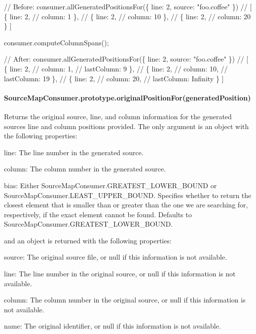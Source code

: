 \begin{DoxyCode}
// Before:
consumer.allGeneratedPositionsFor(\{ line: 2, source: "foo.coffee" \})
// [ \{ line: 2,
//     column: 1 \},
//   \{ line: 2,
//     column: 10 \},
//   \{ line: 2,
//     column: 20 \} ]

consumer.computeColumnSpans();

// After:
consumer.allGeneratedPositionsFor(\{ line: 2, source: "foo.coffee" \})
// [ \{ line: 2,
//     column: 1,
//     lastColumn: 9 \},
//   \{ line: 2,
//     column: 10,
//     lastColumn: 19 \},
//   \{ line: 2,
//     column: 20,
//     lastColumn: Infinity \} ]
\end{DoxyCode}


\paragraph*{Source\+Map\+Consumer.\+prototype.\+original\+Position\+For(generated\+Position)}

Returns the original source, line, and column information for the generated source\textquotesingle{}s line and column positions provided. The only argument is an object with the following properties\+:


\begin{DoxyItemize}
\item {\ttfamily line}\+: The line number in the generated source.
\item {\ttfamily column}\+: The column number in the generated source.
\item {\ttfamily bias}\+: Either {\ttfamily Source\+Map\+Consumer.\+G\+R\+E\+A\+T\+E\+S\+T\+\_\+\+L\+O\+W\+E\+R\+\_\+\+B\+O\+U\+ND} or {\ttfamily Source\+Map\+Consumer.\+L\+E\+A\+S\+T\+\_\+\+U\+P\+P\+E\+R\+\_\+\+B\+O\+U\+ND}. Specifies whether to return the closest element that is smaller than or greater than the one we are searching for, respectively, if the exact element cannot be found. Defaults to {\ttfamily Source\+Map\+Consumer.\+G\+R\+E\+A\+T\+E\+S\+T\+\_\+\+L\+O\+W\+E\+R\+\_\+\+B\+O\+U\+ND}.
\end{DoxyItemize}

and an object is returned with the following properties\+:


\begin{DoxyItemize}
\item {\ttfamily source}\+: The original source file, or null if this information is not available.
\item {\ttfamily line}\+: The line number in the original source, or null if this information is not available.
\item {\ttfamily column}\+: The column number in the original source, or null if this information is not available.
\item {\ttfamily name}\+: The original identifier, or null if this information is not available.
\end{DoxyItemize}


